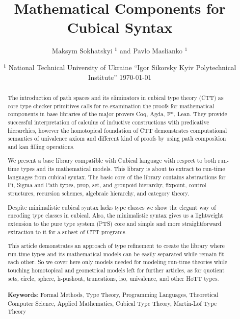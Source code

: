 \documentclass{article}
\begin{document}
\title{Mathematical Components for Cubical Syntax}
\author{Maksym Sokhatskyi $^1$ and Pavlo Maslianko $^1$}
\date{
    $^1$ National Technical University of Ukraine ``Igor Sikorsky Kyiv Polytechnical Institute''
    \today
}

\maketitle

\begin{abstract}

The introduction of path spaces and its eliminators in cubical type theory (CTT)
as core type checker primitives calls for re-examination the proofs for mathematical components
in base libraries of the major provers Coq, Agda, F*, Lean.
They provide successful interpretation of calculus of inductive constructions
with predicative hierarchies, however the homotopical foundation of CTT demonstrates
computational semantics of univalence axiom and different kind of proofs by using path
composition and kan filling operations.

We present a base library compatible with Cubical language \cite{Mortberg17}
with respect to both run-time types and its mathematical models.
This library is about to extract to run-time languages from cubical syntax.
The basic core of the library contains abstractions for Pi, Sigma and Path types,
prop, set, and groupoid hierarchy, fixpoint, control structures, recursion schemes,
algebraic hierarchy, and category theory.

Despite minimalistic cubical syntax lacks type classes we show the elegant
way of encoding type classes in cubical. Also, the minimalistic syntax
gives us a lightweight extension to the pure type system (PTS) core
and simple and more straightforward extraction to it for a subset of CTT programs.

This article demonstrates an approach of type refinement to create
the library where run-time types and its mathematical models can be
easily separated while remain fit each other.
So we cover here only models needed for modeling run-time theories
while touching homotopical and geometrical models left for further
articles, as for quotient sets, circle, sphere, h-pushout, truncations,
iso, univalence, and other HoTT types.
\\
\\
{\bf Keywords}: Formal Methods, Type Theory, Programming Languages,
          Theoretical Computer Science, Applied Mathematics,
          Cubical Type Theory, Martin-Löf Type Theory
\end{abstract}
\end{document}
